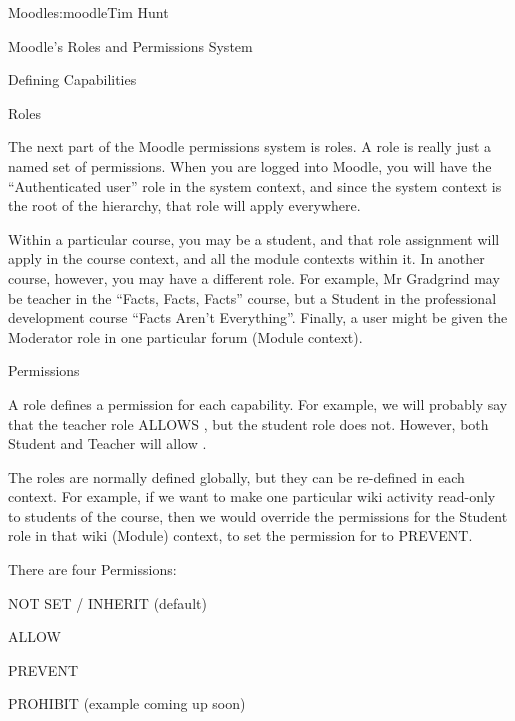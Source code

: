 \begin{aosachapter}{Moodle}{s:moodle}{Tim Hunt}
\begin{aosasect1}{Moodle's Roles and Permissions System}
\begin{aosasect2}{Defining Capabilities}
\end{aosasect2}

\begin{aosasect2}{Roles}

The next part of the Moodle permissions system is roles. A role is
really just a named set of permissions. When you are logged into
Moodle, you will have the ``Authenticated user'' role in the system
context, and since the system context is the root of the hierarchy,
that role will apply everywhere.

Within a particular course, you may be a student, and that role
assignment will apply in the course context, and all the module
contexts within it. In another course, however, you may have a
different role. For example, Mr Gradgrind may be teacher in the
``Facts, Facts, Facts'' course, but a Student in the professional
development course ``Facts Aren't Everything''. Finally, a user might
be given the Moderator role in one particular forum (Module context).

\end{aosasect2}

\begin{aosasect2}{Permissions}

A role defines a permission for each capability. For example, we will
probably say that the teacher role ALLOWS ,
but the student role does not. However, both Student and Teacher will
allow .

The roles are normally defined globally, but they can be re-defined in
each context. For example, if we want to make one particular wiki
activity read-only to students of the course, then we would override
the permissions for the Student role in that wiki (Module) context, to
set the permission for  to PREVENT.

There are four Permissions:

\begin{aosaitemize}

\item NOT SET / INHERIT (default)

\item ALLOW

\item PREVENT

\item PROHIBIT (example coming up soon)

\end{aosaitemize}


\end{aosasect2}
\end{aosasect1}
\end{aosachapter}
